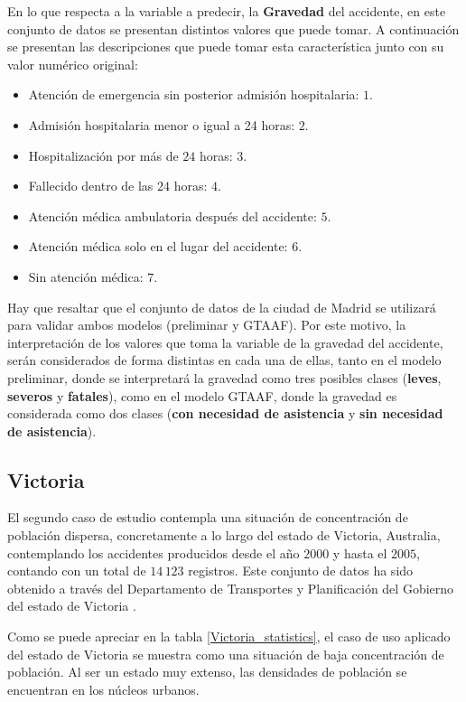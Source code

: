 \documentclass{uathesis-es}
\begin{document}
{		En lo que respecta a la variable a predecir, la \textbf{Gravedad} del accidente, en este conjunto de datos se presentan distintos valores que puede tomar. A continuación se presentan las descripciones que puede tomar esta característica junto con su valor numérico original:
		
		\begin{itemize}
			\item Atención de emergencia sin posterior admisión hospitalaria: $1$.
			\item Admisión hospitalaria menor o igual a 24 horas: $2$.
			\item Hospitalización por más de $24$ horas: $3$.
			\item Fallecido dentro de las $24$ horas: $4$.
			\item Atención médica ambulatoria después del accidente: $5$.
			\item Atención médica solo en el lugar del accidente: $6$.
			\item Sin atención médica: $7$.
		\end{itemize}
		
		Hay que resaltar que el conjunto de datos de la ciudad de Madrid se utilizará para validar ambos modelos (preliminar y GTAAF). Por este motivo, la interpretación de los valores que toma la variable de la gravedad del accidente, serán considerados de forma distintas en cada una de ellas, tanto en el modelo preliminar, donde se interpretará la gravedad como tres posibles clases (\textbf{leves}, \textbf{severos} y \textbf{fatales}), como en el modelo GTAAF, donde la gravedad es considerada como dos clases (\textbf{con necesidad de asistencia} y \textbf{sin necesidad de asistencia}).
		
		
		\subsection*{Victoria}
		
		El segundo caso de estudio contempla una situación de concentración de población dispersa, concretamente a lo largo del estado de Victoria, Australia, contemplando los accidentes producidos desde el año $2000$ y hasta el $2005$, contando con un total de $14\,123$ registros. Este conjunto de datos ha sido obtenido a través del Departamento de Transportes y Planificación del Gobierno del estado de Victoria \cite{InfoDatasetVictoria}.
		
		Como se puede apreciar en la tabla \ref{Victoria_statistics}, el caso de uso aplicado del estado de Victoria se muestra como una situación de baja concentración de población. Al ser un estado muy extenso, las densidades de población se encuentran en los núcleos urbanos.
		
}
\end{document}
